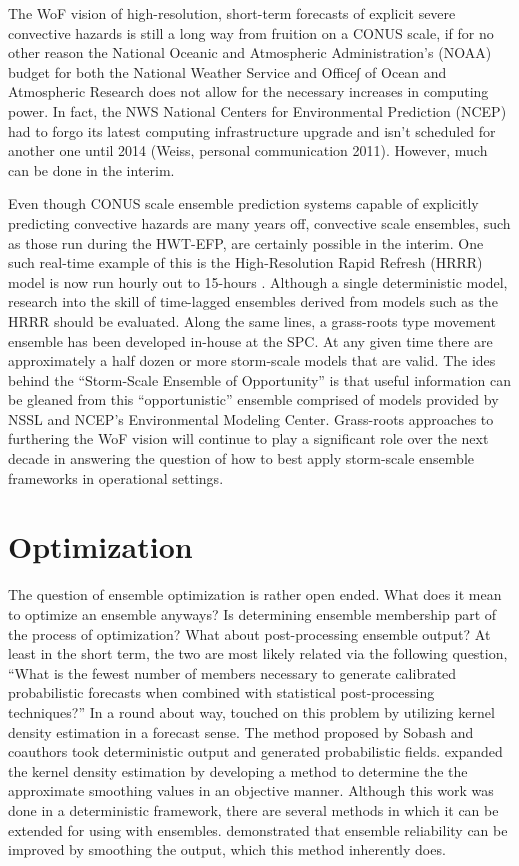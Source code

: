 The WoF vision of high-resolution, short-term forecasts of explicit severe convective hazards is still a long way from fruition on a CONUS scale, if for no other reason the National Oceanic and Atmospheric Administration's (NOAA) budget for both the National Weather Service and Office∫ of Ocean and Atmospheric Research does not allow for the necessary increases in computing power. In fact, the NWS National Centers for Environmental Prediction (NCEP) had to forgo its latest computing infrastructure upgrade and isn't scheduled for another one until 2014 (Weiss, personal communication 2011). However, much can be done in the interim.


Even though CONUS scale ensemble prediction systems capable of explicitly predicting convective hazards are many years off, convective scale ensembles, such as those run during the HWT-EFP, are certainly possible in the interim. One such real-time example of this is the High-Resolution Rapid Refresh (HRRR) model is now run hourly out to 15-hours \citep{smith2008hrrr}. Although a single deterministic model, research into the skill of time-lagged ensembles derived from models such as the HRRR should be evaluated. Along the same lines, a grass-roots type movement ensemble has been developed in-house at the SPC. At any given time there are approximately a half dozen or more storm-scale models that are valid. The ides behind the ``Storm-Scale Ensemble of Opportunity'' is that useful information can be gleaned from this ``opportunistic'' ensemble comprised of models provided by NSSL and NCEP's Environmental Modeling Center. Grass-roots approaches to furthering the WoF vision will continue to play a significant role over the next decade in answering the question of how to best apply storm-scale ensemble frameworks in operational settings.




\section{Optimization}

The question of ensemble optimization is rather open ended. What does it mean to optimize an ensemble anyways? Is determining ensemble membership part of the process of optimization? What about post-processing ensemble output? At least in the short term, the two are most likely related via the following question, ``What is the fewest number of members necessary to generate calibrated probabilistic forecasts when combined with statistical post-processing techniques?''  In a round about way, \cite{sobash2011kde} touched on this problem by utilizing kernel density estimation in a forecast sense. The method proposed by Sobash and coauthors took deterministic output and generated probabilistic fields. \cite{marsh2012callibration} expanded the kernel density estimation by developing a method to determine the the approximate smoothing values in an objective manner. Although this work was done in a deterministic framework, there are several methods in which it can be extended for using with ensembles. \cite{wilks2002smoothing} demonstrated that ensemble reliability can be improved by smoothing the output, which this method inherently does.


